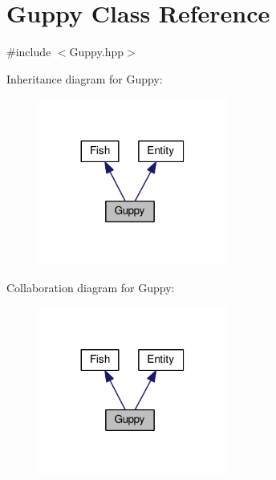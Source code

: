 \hypertarget{classGuppy}{}\section{Guppy Class Reference}
\label{classGuppy}


{\ttfamily \#include $<$Guppy.\+hpp$>$}



Inheritance diagram for Guppy\+:\nopagebreak
\begin{figure}[H]
\begin{center}
\leavevmode
\includegraphics[width=176pt]{classGuppy__inherit__graph}
\end{center}
\end{figure}


Collaboration diagram for Guppy\+:\nopagebreak
\begin{figure}[H]
\begin{center}
\leavevmode
\includegraphics[width=176pt]{classGuppy__coll__graph}
\end{center}
\end{figure}
